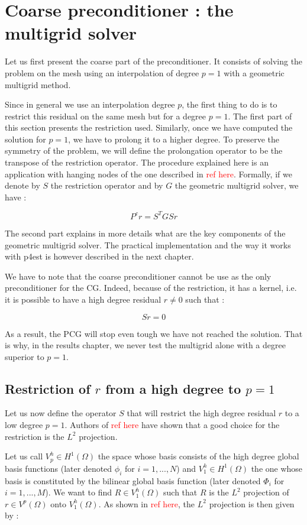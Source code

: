 \section{Coarse preconditioner : the multigrid solver}

Let us first present the coarse part of the preconditioner. It consists of solving the problem on the mesh using an interpolation of degree $p=1$ with a geometric multigrid method. 

Since in general we use an interpolation degree $p$, the first thing to do is to restrict this residual on the same mesh but for a degree $p=1$. The first part of this section presents the restriction used. Similarly, once we have computed the solution for $p=1$, we have to prolong it to a higher degree. To preserve the symmetry of the problem, we will define the prolongation operator to be the transpose of the restriction operator. The procedure explained here is an application with hanging nodes of the one described in \textcolor{red}{ref here}. Formally, if we denote by $S$ the restriction operator and by $G$ the geometric multigrid solver, we have : 

$$P^cr = S^TGSr$$

The second part explains in more details what are the key components of the geometric multigrid solver. The practical implementation and the way it works with p4est is however described in the next chapter. 

We have to note that the coarse preconditioner cannot be use as the only preconditioner for the CG. Indeed, because of the restriction, it has a kernel, i.e. it is possible to have a high degree residual $r\neq 0$ such that : 

$$Sr = 0$$

As a result, the PCG will stop even tough we have not reached the solution. That is why, in the results chapter, we never test the multigrid alone with a degree superior to $p=1$. 

\subsection{Restriction of $r$ from a high degree to $p=1$}

Let us now define the operator $S$ that will restrict the high degree residual $r$ to a low degree $p=1$. Authors of \textcolor{red}{ref here} have shown that a good choice for the restriction is the $L^2$ projection. 

Let us call $V^h_p \in H^1(\Omega)$ the space whose basis consists of the high degree global basis functions (later denoted $\phi_i$ for $i=1,...,N$) and $V^h_1 \in H^1(\Omega)$ the one whose basis is constituted by the bilinear global basis function (later denoted $\Phi_i$ for $i=1,...,M$). We want to find $R \in V^h_1(\Omega)$ such that $R$ is the $L^2$ projection of $r \in V^p(\Omega)$ onto $ V^h_1(\Omega)$. As shown in \textcolor{red}{ref here}, the $L^2$ projection is then given by :

